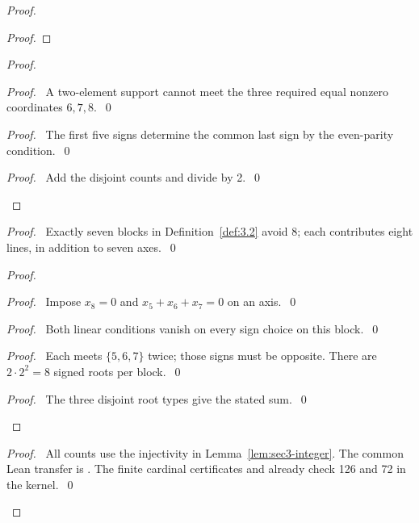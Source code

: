 \begin{proof}
\begin{proof}
 \end{proof}
 \begin{proof}
  \begin{proof}\pf\ A two-element support cannot meet the three required equal
   nonzero coordinates $6,7,8$.~\qed\end{proof}
  \begin{proof}\pf\ The first five signs determine the common last sign by the even-parity condition.~\qed\end{proof}
  \qedstep
  \begin{proof}\pf\ Add the disjoint counts and divide by 2.~\qed\end{proof}
 \end{proof}
 \begin{proof}\pf\ Exactly seven blocks in Definition~\ref{def:3.2} avoid 8;
  each contributes eight lines, in addition to seven axes.~\qed\end{proof}
 \begin{proof}
  \begin{proof}\pf\ Impose $x_8=0$ and $x_5+x_6+x_7=0$ on an axis.~\qed\end{proof}
  \begin{proof}\pf\ Both linear conditions vanish on every sign choice on this block.~\qed\end{proof}
  \begin{proof}\pf\ Each meets $\{5,6,7\}$ twice; those signs must be opposite.
   There are $2\cdot2^2=8$ signed roots per block.~\qed\end{proof}
  \qedstep
  \begin{proof}\pf\ The three disjoint root types give the stated sum.~\qed\end{proof}
 \end{proof}
 \qedstep
 \begin{proof}\pf\ All counts use the injectivity in Lemma~\ref{lem:sec3-integer}.
  The common Lean transfer is .
  The finite cardinal certificates  and
   already check 126 and 72 in the kernel.~\qed\end{proof}
\end{proof}

